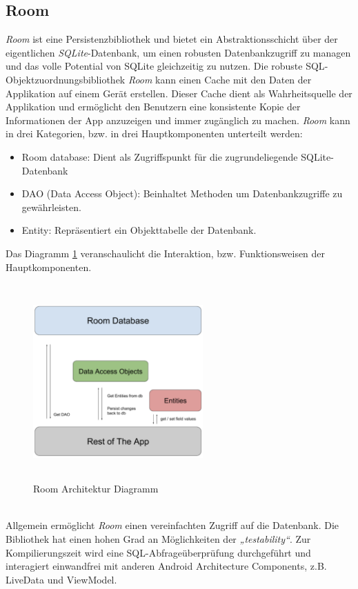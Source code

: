 \subsection*{Room}
\label{sec:Room}
\textit{Room} ist eine Persistenzbibliothek und bietet ein Abstraktionsschicht über der eigentlichen \textit{\acs{SQL}ite}-Datenbank, um einen 
robusten Datenbankzugriff zu managen und das volle Potential von \acs{SQL}ite gleichzeitig zu nutzen. \cite{room.2017}
Die robuste \acs{SQL}-Objektzuordnungsbibliothek \textit{Room} kann einen Cache mit den Daten der Applikation auf einem Gerät erstellen. Dieser 
Cache dient als Wahrheitsquelle der Applikation und ermöglicht den Benutzern eine konsistente Kopie der Informationen der App anzuzeigen 
und immer zugänglich zu machen. \textit{Room} kann in drei Kategorien, bzw. in drei Hauptkomponenten unterteilt werden:
\begin{itemize}
    \item Room database: Dient als Zugriffspunkt für die zugrundeliegende SQLite-Datenbank
    \item DAO (Data Access Object): Beinhaltet Methoden um Datenbankzugriffe zu gewährleisten.
    \item Entity: Repräsentiert ein Objekttabelle der Datenbank.
\end{itemize}
Das Diagramm \ref{pic:roomarchitecturediagramm} veranschaulicht die Interaktion, bzw. Funktionsweisen der Hauptkomponenten.
\begin{figure}[hbt!]
    \centering
    \includegraphics[width=6.5cm,height=7.5cm,keepaspectratio]{2Grundlagen/Bilder/roomArchitecture.png}
    \caption{Room Architektur Diagramm \cite{roomdiagr.2017}}
    \label{pic:roomarchitecturediagramm}
\end{figure}
\\ 
Allgemein ermöglicht \textit{Room} einen vereinfachten Zugriff auf die Datenbank. Die Bibliothek hat einen hohen Grad an Möglichkeiten der \textit{„testability“}. 
Zur Kompilierungszeit wird eine \acs{SQL}-Abfrageüberprüfung durchgeführt und interagiert einwandfrei mit anderen Android Architecture 
Components, z.B. LiveData und ViewModel.

